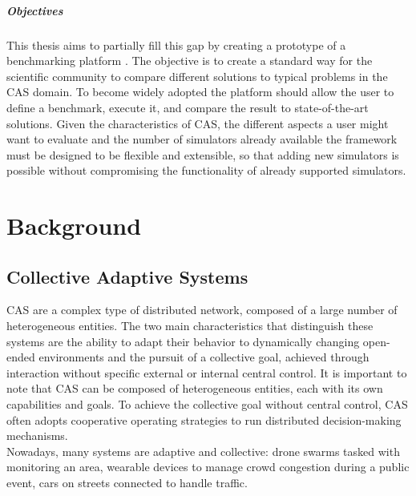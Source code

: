 \documentclass[12pt,a4paper,openright,twoside]{book}
\begin{document}
\paragraph{Objectives}
This thesis aims to partially fill this gap by creating a prototype of a benchmarking platform \cite{DBLP:conf/cisis/VilenicaL12, DBLP:conf/atal/ZhangZWBR20}.
The objective is to create a standard way for the scientific community to compare different solutions to typical problems in the \ac*{CAS} domain.
To become widely adopted the platform should allow the user to define a benchmark, execute it, and compare the result to state-of-the-art solutions.
Given the characteristics of \ac*{CAS}, the different aspects a user might want to evaluate and the number of simulators already available the framework must be designed to be flexible and extensible, 
so that adding new simulators is possible without compromising the functionality of already supported simulators. \cite{DBLP:conf/mascots/Dujmovic99}

\chapter{Background}

\section{Collective Adaptive Systems}

\ac{CAS} are a complex type of distributed network, composed of a large number of heterogeneous entities.
The two main characteristics that distinguish these systems are the ability to adapt their behavior to dynamically changing open-ended environments
and the pursuit of a collective goal, achieved through interaction without specific external or internal central control. \cite{DBLP:series/lncs/HolzlRW08, DBLP:journals/corr/abs-1108-5643}
It is important to note that \ac{CAS} can be composed of heterogeneous entities, each with its own capabilities and goals.
To achieve the collective goal without central control, \ac{CAS} often adopts cooperative operating strategies to run distributed decision-making mechanisms. \cite{DBLP:journals/tomacs/Aldini18} \\

Nowadays, many systems are adaptive and collective: drone swarms tasked with monitoring an area,
wearable devices to manage crowd congestion during a public event, cars on streets connected to handle traffic. \cite{DBLP:journals/sttt/NicolaJW20}
\end{document}
